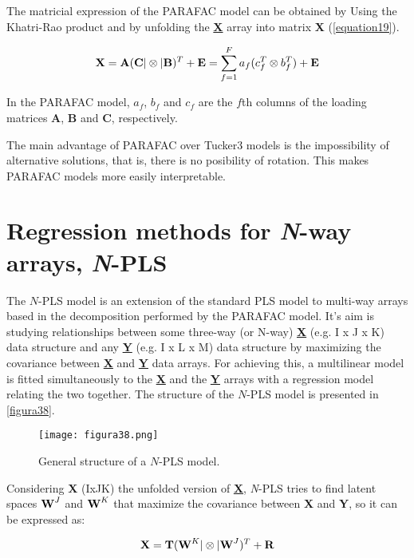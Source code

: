The matricial expression of the PARAFAC model can be obtained by Using the Khatri-Rao product \parencite{liu2008hadamard} and by unfolding the \textbf{\underline{X}} array into matrix \textbf{X} (\autoref{equation19}).

\begin{equation}
\textbf{\text{X}}=\textbf{\text{A}}(\textbf{\text{C}}|\otimes|\textbf{\text{B}})^T + \textbf{\text{E}} = \sum\limits_{f=1}^F a_f(c^T_f\otimes b^T_f)+\textbf{\text{E}}
\label{equation19}
\end{equation}

In the PARAFAC model, $a_f$, $b_f$ and $c_f$ are the $f$th columns of the loading matrices \textbf{A}, \textbf{B} and \textbf{C}, respectively.

The main advantage of PARAFAC over Tucker3 models is the impossibility of alternative solutions, that is, there is no posibility of rotation. This makes PARAFAC models more easily interpretable.

\section{Regression methods for \textit{N}-way arrays, \textit{N}-PLS}
\label{NPLSregression}
The $N$-PLS model is an extension of the standard PLS model to multi-way arrays based in the decomposition performed by the PARAFAC model. It's aim is studying relationships between some three-way (or N-way) \textbf{\underline{X}} (e.g. I x J x K) data structure and any \textbf{\underline{Y}} (e.g. I x L x M) data structure by maximizing the covariance between \textbf{\underline{X}} and \textbf{\underline{Y}} data arrays. For achieving this, a multilinear model is fitted simultaneously to the \textbf{\underline{X}} and the \textbf{\underline{Y}} arrays with a regression model relating the two together. The structure of the $N$-PLS model is presented in \autoref{figura38}.

\begin{figure}[hbtp]
\centering
\texttt{[image: figura38.png]}
\caption{General structure of a $N$-PLS model.}
\label{figura38}
\end{figure}


Considering \textbf{X} (IxJK) the unfolded version of \textbf{\underline{X}}, \textit{N}-PLS tries to find latent spaces $\textbf{\text{W}}^{J}$ and $\textbf{\text{W}}^{K}$ that maximize the covariance between \textbf{X} and \textbf{Y}, so it can be expressed as:

\begin{equation}
\textbf{\text{X}}=\textbf{\text{T}}(\textbf{\text{W}}^{K}|\otimes{}|\textbf{\text{W}}^{J})^{T}+\textbf{\text{R}}
\label{equation01}
\end{equation}

